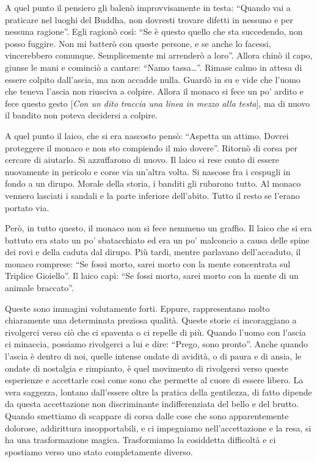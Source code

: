 A quel punto il pensiero gli balenò improvvisamente in testa: ``Quando vai a praticare nel luoghi del Buddha, non dovresti trovare difetti in nessuno e per nessuna ragione''. Egli ragionò così: ``Se è questo quello che sta succedendo, non posso fuggire. Non mi batterò con queste persone, e se anche lo facessi, vincerebbero comunque. Semplicemente mi arrenderò a loro''. Allora chinò il capo, giunse le mani e cominciò a cantare: ``Namo tassa\ldots{}''. Rimase calmo in attesa di essere colpito dall'ascia, ma non accadde nulla. Guardò in su e vide che l'uomo che teneva l'ascia non riusciva a colpire. Allora il monaco si fece un po' ardito e fece questo gesto $[$\textit{Con un dito} \textit{t}\textit{raccia una linea in mezzo alla testa}$]$, ma di nuovo il bandito non poteva decidersi a colpire.

A quel punto il laico, che si era nascosto pensò: ``Aspetta un attimo. Dovrei proteggere il monaco e non sto compiendo il mio dovere''. Ritornò di corsa per cercare di aiutarlo. Si azzuffarono di nuovo. Il laico si rese conto di essere nuovamente in pericolo e corse via un'altra volta. Si nascose fra i cespugli in fondo a un dirupo. Morale della storia, i banditi gli rubarono tutto. Al monaco vennero lasciati i sandali e la parte inferiore dell'abito. Tutto il resto se l'erano portato via.

Però, in tutto questo, il monaco non si fece nemmeno un graffio. Il laico che si era battuto era stato un po' sbatacchiato ed era un po' malconcio a causa delle spine dei rovi e della caduta dal dirupo. Più tardi, mentre parlavano dell'accaduto, il monaco comprese: ``Se fossi morto, sarei morto con la mente concentrata sul Triplice Gioiello''. Il laico capì: ``Se fossi morto, sarei morto con la mente di un animale braccato''. 

Queste sono immagini volutamente forti. Eppure, rappresentano molto chiaramente una determinata preziosa qualità. Queste storie ci incoraggiano a rivolgerci verso ciò che ci spaventa o ci repelle di più. Quando l'uomo con l'ascia ci minaccia, possiamo rivolgerci a lui e dire: ``Prego, sono pronto''. Anche quando l'ascia è dentro di noi, quelle intense ondate di avidità, o di paura e di ansia, le ondate di nostalgia e rimpianto, è quel movimento di rivolgersi verso queste esperienze e accettarle così come sono che permette al cuore di essere libero. La vera saggezza, lontano dall'essere oltre la pratica della gentilezza, di fatto dipende da questa accettazione non discriminante indifferenziata del bello e del brutto. Quando smettiamo di scappare di corsa dalle cose che sono apparentemente dolorose, addirittura insopportabili, e ci impegniamo nell'accettazione e la resa, si ha una trasformazione magica. Trasformiamo la cosiddetta difficoltà e ci spostiamo verso uno stato completamente diverso.

